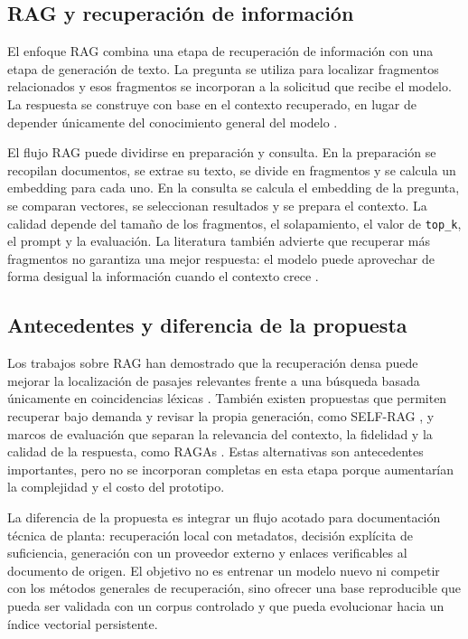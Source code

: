 \subsection{RAG y recuperación de información}

El enfoque RAG combina una etapa de recuperación de información con una etapa de generación de texto. La pregunta se utiliza para localizar fragmentos relacionados y esos fragmentos se incorporan a la solicitud que recibe el modelo. La respuesta se construye con base en el contexto recuperado, en lugar de depender únicamente del conocimiento general del modelo \cite{lewis2020rag,gao2023rag}.

El flujo RAG puede dividirse en preparación y consulta. En la preparación se recopilan documentos, se extrae su texto, se divide en fragmentos y se calcula un embedding para cada uno. En la consulta se calcula el embedding de la pregunta, se comparan vectores, se seleccionan resultados y se prepara el contexto. La calidad depende del tamaño de los fragmentos, el solapamiento, el valor de \texttt{top\_k}, el prompt y la evaluación. La literatura también advierte que recuperar más fragmentos no garantiza una mejor respuesta: el modelo puede aprovechar de forma desigual la información cuando el contexto crece \cite{liu2024lostmiddle}.

\subsection{Antecedentes y diferencia de la propuesta}

Los trabajos sobre RAG han demostrado que la recuperación densa puede mejorar la localización de pasajes relevantes frente a una búsqueda basada únicamente en coincidencias léxicas \cite{karpukhin2020dpr}. También existen propuestas que permiten recuperar bajo demanda y revisar la propia generación, como SELF-RAG \cite{asai2024selfrag}, y marcos de evaluación que separan la relevancia del contexto, la fidelidad y la calidad de la respuesta, como RAGAs \cite{es2024ragas}. Estas alternativas son antecedentes importantes, pero no se incorporan completas en esta etapa porque aumentarían la complejidad y el costo del prototipo.

La diferencia de la propuesta es integrar un flujo acotado para documentación técnica de planta: recuperación local con metadatos, decisión explícita de suficiencia, generación con un proveedor externo y enlaces verificables al documento de origen. El objetivo no es entrenar un modelo nuevo ni competir con los métodos generales de recuperación, sino ofrecer una base reproducible que pueda ser validada con un corpus controlado y que pueda evolucionar hacia un índice vectorial persistente.

